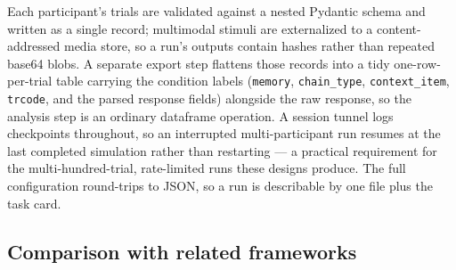 \documentclass[11pt]{article}
\begin{document}
Each participant's trials are validated against a nested Pydantic schema
and written as a single record; multimodal stimuli are externalized to a
content-addressed media store, so a run's outputs contain hashes rather
than repeated base64 blobs. A separate export step flattens those records
into a tidy one-row-per-trial table carrying the condition labels
(\texttt{memory}, \texttt{chain\_type}, \texttt{context\_item},
\texttt{trcode}, and the parsed response fields) alongside the raw
response, so the analysis step is an ordinary dataframe operation. A
session tunnel logs checkpoints throughout, so an interrupted
multi-participant run resumes at the last completed simulation rather than
restarting --- a practical requirement for the multi-hundred-trial,
rate-limited runs these designs produce. The full configuration
round-trips to JSON, so a run is describable by one file plus the task
card.

\subsection{Comparison with related frameworks}
\label{sec:framework-compare}
\end{document}
